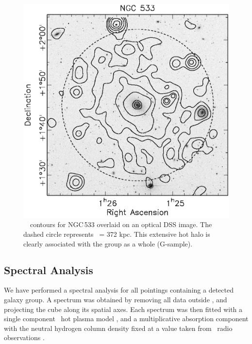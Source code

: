 \documentclass[usenatbib]{mn2e}
\begin{document}
\begin{figure}
\begin{minipage}[t]{241pt}
    \includegraphics[width=0.9\linewidth]{fig_04.ps}
    \caption{\ROSAT\ \PSPC\ contours for NGC\,533 overlaid on an optical DSS image.
             The dashed circle represents \rcut\ = 372 kpc. This extensive hot
             halo is clearly associated with the group as a whole (G-sample).}
    \label{fig_ngc533_ovly}

  \end{minipage}
\end{figure}


\subsection{Spectral Analysis}
\label{sec_spectral}

We have performed a spectral analysis for all pointings containing a detected
galaxy group.  A spectrum was obtained by removing all data outside \rcut, and
projecting the cube along its spatial axes.  Each spectrum was then
fitted with a single component \MEKAL\ hot plasma model \citep*{mewe86}, and a
multiplicative absorption component with the neutral hydrogen column density
fixed at a value taken from \Hone\ radio observations \citep{dickey90}.
\end{document}
